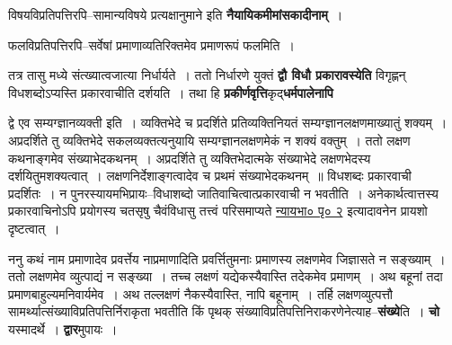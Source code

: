 \documentclass[article,12pt,a4paper]{memoir}
\begin{document}
	  \pstart विषयविप्रतिपत्तिरपि--सामान्यविषये प्रत्यक्षानुमाने इति \textbf{नैयायिकमीमांसकादीनाम्} ।
	\pend
      

	  \pstart फलविप्रतिपत्तिरपि--सर्वेषां प्रमाणाव्यतिरिक्तमेव प्रमाणरूपं फलमिति ।
	\pend
      

	  \pstart तत्र तासु मध्ये संत्ख्यात्वजात्या निर्धार्यते । ततो निर्धारणे युक्तं \textbf{द्वौ विधौ प्रकारावस्येति} विगृह्णन् विधशब्दोऽप्यस्ति प्रकारवाचीति दर्शयति । तथा हि \textbf{प्रकीर्णवृत्ति}कृद्\textbf{धर्मपालेनापि}  \leavevmode{} 
	  
	द्वे एव सम्यग्ज्ञानव्यक्ती इति । व्यक्तिभेदे च प्रदर्शिते प्रतिव्यक्तिनियतं सम्यग्ज्ञानलक्षणमाख्यातुं शक्यम् । अप्रदर्शिते तु व्यक्तिभेदे सकलव्यक्तत्यनुयायि सम्यग्ज्ञानलक्षणमेकं न शक्यं वक्तुम् । ततो लक्षण कथनाङ्गमेव संख्याभेदकथनम् । अप्रदर्शिते तु व्यक्तिभेदात्मके संख्याभेदे लक्षणभेदस्य दर्शयितुमशक्यत्वात् । लक्षणनिर्देशाङ्गत्वादेव च प्रथमं संख्याभेदकथनम् ॥ विधशब्दः प्रकारवाची प्रदर्शितः । न पुनरस्यायमभिप्रायः--विधाशब्दो जातिवाचित्वात्प्रकारवाची न भवतीति । अनेकार्थत्वात्तस्य प्रकारवाचिनोऽपि प्रयोगस्य चतसृषु चैवंविधासु तत्त्वं परिसमाप्यते \href{http://sarit.indology.info/?cref=nbh.1.1.1_p3}{न्यायभा० पृ० २} इत्यादावनेन प्रायशो दृष्टत्वात् ।
	\pend
      

	  \pstart ननु कथं नाम प्रमाणादेव प्रवर्त्तेय नाप्रमाणादिति प्रवर्त्तितुमनाः प्रमाणस्य लक्षणमेव जिज्ञासते न सङ्ख्याम् । ततो लक्षणमेव व्युत्पाद्यं न सङ्ख्या । तच्च लक्षणं यद्येकस्यैवास्ति तदेकमेव प्रमाणम् । अथ बहूनां तदा प्रमाणबाहुल्यमनिवार्यमेव । अथ तल्लक्षणं नैकस्यैवास्ति, नापि बहूनाम् । तर्हि लक्षणव्युत्पत्तौ सामर्थ्यात्संख्याविप्रतिपत्तिर्निराकृता भवतीति किं पृथक् संख्याविप्रतिपत्तिनिराकरणेनेत्याह--\textbf{संख्ये}ति । \textbf{चो} यस्मादर्थे । \textbf{द्वार}मुपायः ।
	\pend
      
\end{document}
